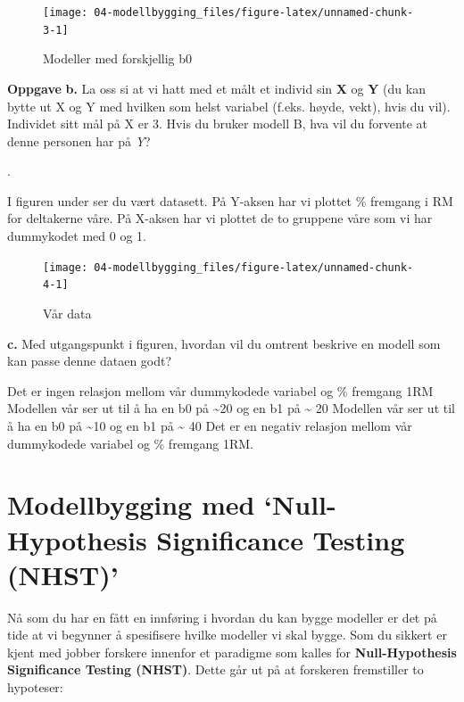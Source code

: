 \documentclass[
]{book}
\begin{document}
\begin{figure}

{\centering \texttt{[image: 04-modellbygging\_files/figure-latex/unnamed-chunk-3-1]} 

}

\caption{Modeller med forskjellig b0}\label{fig:unnamed-chunk-3}
\end{figure}

\textbf{Oppgave}
\textbf{b.} La oss si at vi hatt med et målt et individ sin \textbf{X} og \textbf{Y} (du kan bytte ut X og Y med hvilken som helst variabel (f.eks. høyde, vekt), hvis du vil). Individet sitt mål på X er 3. Hvis du bruker modell B, hva vil du forvente at denne personen har på \emph{Y}?

.

I figuren under ser du vært datasett. På Y-aksen har vi plottet \% fremgang i RM for deltakerne våre. På X-aksen har vi plottet de to gruppene våre som vi har dummykodet med 0 og 1.

\begin{figure}

{\centering \texttt{[image: 04-modellbygging\_files/figure-latex/unnamed-chunk-4-1]} 

}

\caption{Vår data}\label{fig:unnamed-chunk-4}
\end{figure}

\textbf{c.} Med utgangspunkt i figuren, hvordan vil du omtrent beskrive en modell som kan passe denne dataen godt?

Det er ingen relasjon mellom vår dummykodede variabel og \% fremgang 1RM Modellen vår ser ut til å ha en b0 på \textasciitilde20 og en b1 på \textasciitilde{} 20 Modellen vår ser ut til å ha en b0 på \textasciitilde10 og en b1 på \textasciitilde{} 40 Det er en negativ relasjon mellom vår dummykodede variabel og \% fremgang 1RM.

\hypertarget{modellbygging-med-null-hypothesis-significance-testing-nhst}{%
\section{Modellbygging med `Null-Hypothesis Significance Testing (NHST)'}\label{modellbygging-med-null-hypothesis-significance-testing-nhst}}

Nå som du har en fått en innføring i hvordan du kan bygge modeller er det på tide at vi begynner å spesifisere hvilke modeller vi skal bygge. Som du sikkert er kjent med jobber forskere innenfor et paradigme som kalles for \textbf{Null-Hypothesis Significance Testing (NHST)}. Dette går ut på at forskeren fremstiller to hypoteser:
\end{document}
